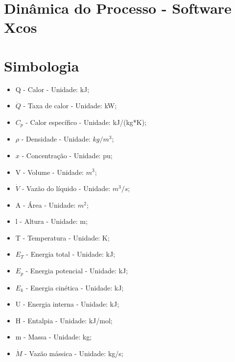 \documentclass[
	12pt,				%
	openright,			%
	oneside,			%
	a4paper,			%
	english,			%
	french,				%
	spanish,			%
	brazil				%
	]{abntex2}
\begin{document}
\newpage
\chapter{Dinâmica do Processo - Software Xcos}
\pagestyle{fancy}

\newpage
\chapter{Simbologia}
\pagestyle{fancy}

\begin{itemize}
\item Q - Calor - Unidade: kJ;
\item $\dot{Q}$ - Taxa de calor - Unidade: kW;
\item $C_{p}$ - Calor específico - Unidade: kJ/(kg*K);
\item $\rho$ - Densidade - Unidade: $kg/m^{3}$;
\item $x$ - Concentração - Unidade: pu;
\item V - Volume - Unidade: $m^{3}$;
\item $\dot{V}$ - Vazão do líquido - Unidade: $m^{3}/s$;
\item A - Área - Unidade: $m^{2}$;
\item l - Altura - Unidade: m;
\item T - Temperatura - Unidade: K;
\item $E_{T}$ - Energia total - Unidade: kJ;
\item $E_{p}$ - Energia potencial - Unidade: kJ;
\item $E_{k}$ - Energia cinética - Unidade: kJ;
\item U - Energia interna - Unidade: kJ;
\item H - Entalpia - Unidade: kJ/mol;
\item m - Massa - Unidade: kg;
\item $\dot{M}$ - Vazão mássica - Unidade: kg/s;
\end{itemize}

\newpage
\postextual



\end{document}

